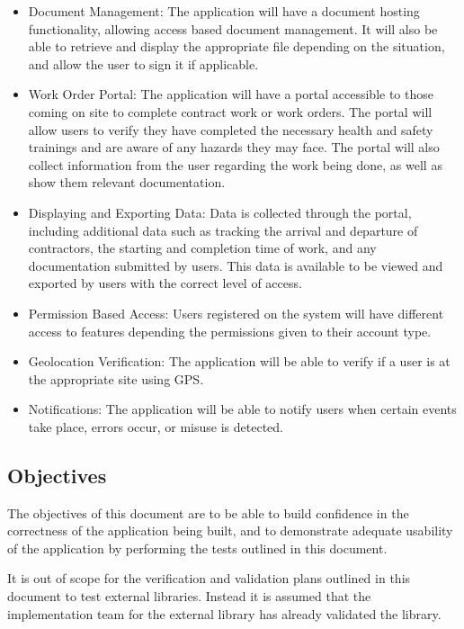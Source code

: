 \documentclass[12pt, titlepage]{article}
\begin{document}
\begin{itemize}
  \item Document Management: The application will have a document
    hosting functionality, allowing access based document management.
    It will also be able to retrieve and display the appropriate file
    depending on the situation, and allow the user to sign it if applicable.
  \item Work Order Portal: The application will have a portal
    accessible to those coming on site to complete contract work or
    work orders. The portal will allow users to verify they have
    completed the necessary health and safety trainings and are aware
    of any hazards they may face. The portal will also collect
    information from the user regarding the work being done, as well
    as show them relevant documentation.
  \item Displaying and Exporting Data: Data is collected through the
    portal, including additional data such as tracking the arrival
    and departure of contractors, the starting and completion time of
    work, and any documentation submitted by users. This data is
    available to be viewed and exported by users with the correct
    level of access.
  \item Permission Based Access: Users registered on the system will
    have different access to features depending the permissions given
    to their account type.
  \item Geolocation Verification: The application will be able to
    verify if a user is at the appropriate site using GPS.
  \item Notifications: The application will be able to notify users
    when certain events take place, errors occur, or misuse is detected.
\end{itemize}

\subsection{Objectives}

The objectives of this document are to be able to build confidence in
the correctness of the application being built, and to demonstrate
adequate usability of the application by performing the tests
outlined in this document.

It is out of scope for the verification and validation plans outlined
in this document to test external libraries. Instead it is assumed
that the implementation team for the external library has already
validated the library.
\end{document}
